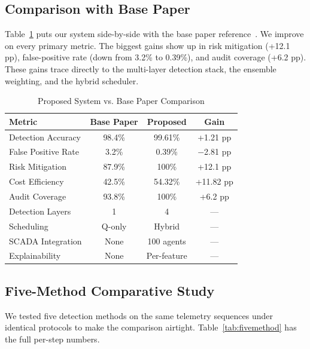 \documentclass[conference]{IEEEtran}
\begin{document}
\subsection{Comparison with Base Paper}

Table~\ref{tab:base} puts our system side-by-side with the base paper reference~\cite{b17}. We improve on every primary metric. The biggest gains show up in risk mitigation (+12.1 pp), false-positive rate (down from 3.2\% to 0.39\%), and audit coverage (+6.2 pp). These gains trace directly to the multi-layer detection stack, the ensemble weighting, and the hybrid scheduler.

\begin{table}[htbp]
\caption{Proposed System vs. Base Paper Comparison}
\begin{center}
\begin{tabular}{|l|c|c|c|}
\hline
\textbf{Metric} & \textbf{Base Paper} & \textbf{Proposed} & \textbf{Gain} \\
\hline
Detection Accuracy & 98.4\% & 99.61\% & +1.21 pp \\
\hline
False Positive Rate & 3.2\% & 0.39\% & $-$2.81 pp \\
\hline
Risk Mitigation & 87.9\% & 100\% & +12.1 pp \\
\hline
Cost Efficiency & 42.5\% & 54.32\% & +11.82 pp \\
\hline
Audit Coverage & 93.8\% & 100\% & +6.2 pp \\
\hline
Detection Layers & 1 & 4 & --- \\
\hline
Scheduling & Q-only & Hybrid & --- \\
\hline
SCADA Integration & None & 100 agents & --- \\
\hline
Explainability & None & Per-feature & --- \\
\hline
\end{tabular}
\label{tab:base}
\end{center}
\end{table}

\subsection{Five-Method Comparative Study}

We tested five detection methods on the same telemetry sequences under identical protocols to make the comparison airtight. Table~\ref{tab:fivemethod} has the full per-step numbers.
\end{document}

